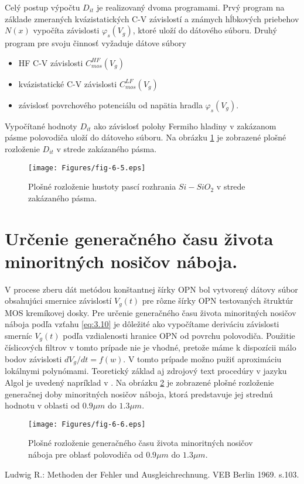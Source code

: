 Celý postup výpočtu $D_{it}$ je realizovaný dvoma programami. Prvý program na základe zmeraných kvázistatických C-V závislostí a známych hĺbkových priebehov $N(x)$ vypočíta závislosti $\varphi_{s}(V_{g})$, ktoré uloží do dátového súboru.  Druhý program pre svoju činnosť vyžaduje dátove súbory

\begin{itemize}
\item HF C-V závislosti $C_{mos}^{HF}(V_{g})$
\item kvázistatické C-V závislosti $C_{mos}^{LF}(V_{g})$
\item závislosť povrchového potenciálu od napätia hradla $\varphi_{s}(V_{g})$.
\end{itemize}

Vypočítané hodnoty $D_{it}$ ako závislosť polohy Fermiho hladiny v
zakázanom pásme polovodiča uloží do dátoveho súboru. Na obrázku
\ref{fig:6.5} je zobrazené plošné rozloženie $D_{it}$ v strede
zakázaného pásma.

\begin{figure}[h!]\centering
\texttt{[image: Figures/fig-6-5.eps]}
\captionsetup{justification=raggedright, singlelinecheck=false}
\caption[Plošné rozloženie hustoty pascí rozhrania $Si-SiO_{2}$ v
  strede zakázaného pásma]{Plošné rozloženie hustoty pascí rozhrania
  $Si-SiO_{2}$ v strede zakázaného pásma.}
\label{fig:6.5}
\end{figure}


\section{Určenie generačného času života minoritných nosičov náboja.}\label{sec:6.4}

V procese zberu dát metódou konštantnej šírky OPN bol vytvorený dátovy
súbor obsahujúci smernice závislostí $V_{g}(t)$ pre rôzne šírky OPN
testovaných štruktúr MOS kremíkovej dosky. Pre určenie generačného
času života minoritných nosičov náboja podľa vzťahu \ref{eq:3.10} je
dôležité ako vypočítame deriváciu závislosti smerníc $V_{g}(t)$ podľa
vzdialenosti hranice OPN od povrchu polovodiča. Použitie číslicových
filtrov v tomto prípade nie je vhodné, pretože máme k dispozícii málo
bodov závislosti $dV_{g}/dt = f(w)$. V tomto prípade možno pužiť
aproximáciu lokálnymi polynómami. Teoretický základ aj zdrojový text
procedúry v jazyku Algol je uvedený napríklad v \cite{6.1}. Na obrázku
\ref{fig:6.6} je zobrazené plošné rozloženie generačnej doby
minoritných nosičov náboja, ktorá predstavuje jej strednú hodnotu v
oblasti od $0.9 \mu m$ do $1.3 \mu m$.

\begin{figure}[h!]\centering
\texttt{[image: Figures/fig-6-6.eps]}
\captionsetup{justification=raggedright, singlelinecheck=false}
\caption[Plošné rozloženie generačného času života minoritných nosičov
  náboja]{Plošné rozloženie generačného času života minoritných
  nosičov náboja pre oblasť polovodiča od $0.9 \mu m$ do $1.3
  \mu m$.}
\label{fig:6.6}
\end{figure}

\begin{thebibliography}{}
Ludwig R.: Methoden der Fehler und Ausgleichrechnung. VEB Berlin 1969. s.103.
\end{thebibliography}
